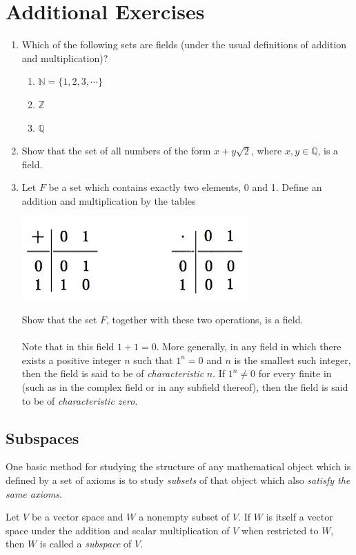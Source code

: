 \documentclass[12pt,letterpaper,reqno]{article}
\numberwithin{equation}{section}
\newcommand{\ti}[1]{\textit{#1}}
\begin{document}
\section*{Additional Exercises}
\begin{enumerate}
	\item Which of the following sets are fields (under the usual definitions of addition and multiplication)?
	\begin{enumerate}
		\item $\mathbb{N}=\{1,2,3,\cdots\}$
		\item $\mathbb{Z}$
		\item $\mathbb{Q}$
	\end{enumerate}
	\item Show that the set of all numbers of the form $x+y\sqrt{2}$, where $x,y \in \mathbb{Q}$, is a field.
	\item Let $F$ be a set which contains exactly two elements, 0 and 1. Define an addition and multiplication by the tables

\begin{center}
\includegraphics[scale=0.5]{figures_mvc/F2}	
\end{center}


Show that the set $F$, together with these two operations, is a field. \\
\\
Note that in this field $1+1=0$. More generally, in any field in which there exists a positive integer $n$ such that $1^n=0$ and $n$ is the smallest such integer, then the field is said to be of \emph{characteristic} $n$. If $1^n \neq 0$ for every finite in (such as in the complex field or in any subfield thereof), then the field is said to be of \emph{characteristic zero}.
\end{enumerate}

\subsection{Subspaces}
One basic method for studying the structure of any mathematical object which is defined by a set of axioms is to study \emph{subsets} of that object which also \emph{satisfy the same axioms}. 
\begin{defn}[Subspace]\label{def:subspace}
Let $V$ be a vector space and $W$ a nonempty subset of $V$. If $W$ is itself a vector space under the addition and scalar multiplication of $V$ when restricted to $W$, then $W$ is called a \ti{subspace} of $V$. 	
\end{defn}
\end{document}
